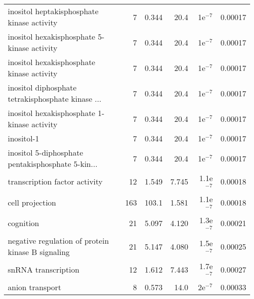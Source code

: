 \begin{longtable}{lrrrrr}
        inositol heptakisphosphate kinase activity &                       7 &                   0.344 &       20.4 &            1e$^{-7}$ &              0.00017 \\
       inositol hexakisphosphate 5-kinase activity &                       7 &                   0.344 &       20.4 &            1e$^{-7}$ &              0.00017 \\
         inositol hexakisphosphate kinase activity &                       7 &                   0.344 &       20.4 &            1e$^{-7}$ &              0.00017 \\
 inositol diphosphate tetrakisphosphate kinase ... &                       7 &                   0.344 &       20.4 &            1e$^{-7}$ &              0.00017 \\
       inositol hexakisphosphate 1-kinase activity &                       7 &                   0.344 &       20.4 &            1e$^{-7}$ &              0.00017 \\
                                        inositol-1 &                       7 &                   0.344 &       20.4 &            1e$^{-7}$ &              0.00017 \\
 inositol 5-diphosphate pentakisphosphate 5-kin... &                       7 &                   0.344 &       20.4 &            1e$^{-7}$ &              0.00017 \\
                     transcription factor activity &                      12 &                   1.549 &      7.745 &          1.1e$^{-7}$ &              0.00018 \\
                                   cell projection &                     163 &                   103.1 &      1.581 &          1.1e$^{-7}$ &              0.00018 \\
                                         cognition &                      21 &                   5.097 &      4.120 &          1.3e$^{-7}$ &              0.00021 \\
 negative regulation of protein kinase B signaling &                      21 &                   5.147 &      4.080 &          1.5e$^{-7}$ &              0.00025 \\
                               snRNA transcription &                      12 &                   1.612 &      7.443 &          1.7e$^{-7}$ &              0.00027 \\
                                   anion transport &                       8 &                   0.573 &       14.0 &            2e$^{-7}$ &              0.00033 \\

\end{longtable}
